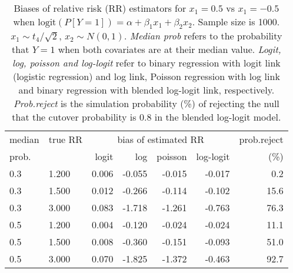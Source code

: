 \documentclass[12pt,a4paper]{article}
\begin{document}
\begin{table}[H] 
\small\sf\centering 
\caption{Biases of relative risk (RR) estimators for $x_1=0.5$ vs $x_1=-0.5$ when $\mbox{logit}(P[Y=1])=\alpha+\beta_1 x_1 + \beta_2 x_2$. Sample size is 1000. $x_1 \sim $$t_4/\sqrt{2}$, $x_2 \sim N(0,1)$. {\it Median prob} refers to the probability that $Y=1$ when both covariates are at their median value. {\it Logit, log, poisson and log-logit} refer to binary regression with logit link (logistic regression) and log link, Poisson regression with log link and binary regression with blended log-logit link, respectively. {\it Prob.reject} is the simulation probability (\%) of rejecting the null that the cutover probability is $0.8$ in the blended log-logit model.} 
\begin{tabular}{llrrrrr} 
\toprule 
median & true RR & \multicolumn{4}{c}{bias of estimated RR} & prob.reject \\ 
prob. & & logit & log & poisson & log-logit  & (\%) \\ \midrule 
0.3 & 1.200 & 0.006 & -0.055 & -0.015 & -0.017 &  0.2 \\  
0.3 & 1.500 & 0.012 & -0.266 & -0.114 & -0.102 & 15.6 \\  
0.3 & 3.000 & 0.083 & -1.718 & -1.261 & -0.763 & 76.3 \\  
0.5 & 1.200 & 0.004 & -0.120 & -0.024 & -0.024 & 11.1 \\  
0.5 & 1.500 & 0.008 & -0.360 & -0.151 & -0.093 & 51.0 \\  
0.5 & 3.000 & 0.070 & -1.825 & -1.372 & -0.463 & 92.7 \\  
\bottomrule 
\end{tabular} 
\end{table} 
\end{document}
